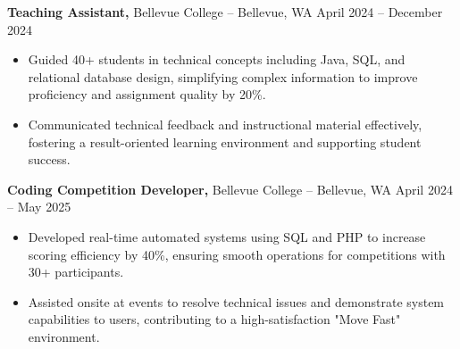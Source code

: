 \documentclass[11pt]{article}       %
\begin{document}
\textbf{Teaching Assistant,} {Bellevue College} -- Bellevue, WA \hfill April 2024 -- December 2024 \\
\vspace{-9pt}
\begin{itemize}
  \item Guided 40+ students in technical concepts including Java, SQL, and relational database design, simplifying complex information to improve proficiency and assignment quality by 20\%.
  \item Communicated technical feedback and instructional material effectively, fostering a result-oriented learning environment and supporting student success.
\end{itemize}

\textbf{Coding Competition Developer,} {Bellevue College} -- Bellevue, WA \hfill April 2024 -- May 2025 \\
\vspace{-9pt}
\begin{itemize}
  \item Developed real-time automated systems using SQL and PHP to increase scoring efficiency by 40\%, ensuring smooth operations for competitions with 30+ participants.
  \item Assisted onsite at events to resolve technical issues and demonstrate system capabilities to users, contributing to a high-satisfaction "Move Fast" environment.
\end{itemize}

\end{document}
